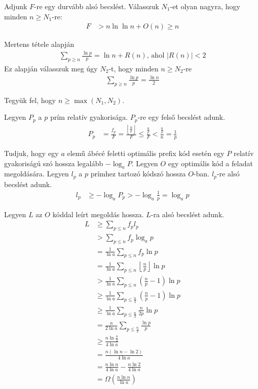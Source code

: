 \documentclass[12pt]{report}
\begin{document}
Adjunk $F$-re egy durvább alsó becslést.
Válasszuk $N_1$-et olyan nagyra, hogy minden $n \ge N_1$-re:
\begin{align*}
F &> n \ln{\ln{n}} + O(n) \ge n
\end{align*}

Mertens tétele\cite{mertens} alapján
\begin{align*}
\sum_{p \ge n} \frac{\ln{p}}{p} = \ln{n} + R(n) \text{, ahol } |R(n)| < 2
\end{align*}
Ez alapján válasszuk meg úgy $N_2$-t,
hogy minden $n \ge N_2$-re
\begin{align*}
\sum_{p \ge n} \frac{\ln{p}}{p} = \frac{\ln{n}}{2}
\end{align*}

Tegyük fel, hogy $n \ge \max(N_1, N_2)$.

Legyen $P_p$ a $p$ prím relatív gyakorisága.
$P_p$-re egy felső becslést adunk.
\begin{align*}
P_p &= \frac{f_p}{F}
= \frac{\left\lfloor \frac{n}{p} \right\rfloor}{F}
\le \frac{\frac{n}{p}}{F}
< \frac{\frac{n}{p}}{n}
= \frac{1}{p}
\end{align*}

Tudjuk\cite{info-theory}, hogy egy $a$ elemű ábécé feletti
optimális prefix kód esetén egy $P$ relatív gyakoriságú szó
hossza legalább $- \log_{a}{P}$.
Legyen $O$ egy optimális kód a feladat megoldására.
Legyen $l_p$ a $p$ prímhez tartozó kódszó hossza $O$-ban.
$l_p$-re alsó becslést adunk.
\begin{align*}
l_p &\ge -\log_{a}{P_p} 
> - \log_{a}{\frac{1}{p}}
= \log_{a}{p}
\end{align*}

Legyen $L$ az $O$ kóddal leírt megoldás hossza.
$L$-ra alsó becslést adunk.
\begin{align*}
L &\ge \sum_{p \le n} f_p l_p \\
&> \sum_{p \le n} f_p \log_{a}{p} \\
&= \frac{1}{\ln{a}} \sum_{p \le n} f_p \ln{p} \\
&= \frac{1}{\ln{a}} \sum_{p \le n} \left\lfloor \frac{n}{p} \right\rfloor \ln{p} \\
&> \frac{1}{\ln{a}} \sum_{p \le n} \left( \frac{n}{p} - 1 \right) \ln{p} \\
&\ge \frac{1}{\ln{a}} \sum_{p \le \frac{n}{2}} \left( \frac{n}{p} - 1 \right) \ln{p} \\
&\ge \frac{1}{\ln{a}} \sum_{p \le \frac{n}{2}} \frac{n}{2p} \ln{p} \\
&= \frac{n}{2 \ln{a}} \sum_{p \le \frac{n}{2}} \frac{\ln{p}}{p} \\
&\ge \frac{n \ln{\frac{n}{2}}}{4 \ln{a}} \\
&= \frac{n (\ln{n} - \ln{2})}{4 \ln{a}} \\
&= \frac{n \ln{n}}{4 \ln{a}} - \frac{n \ln{2}}{4 \ln{a}} \\
&= \Omega \left( \frac{n \ln{n}}{\ln{a}} \right)
\end{align*}
\end{document}
